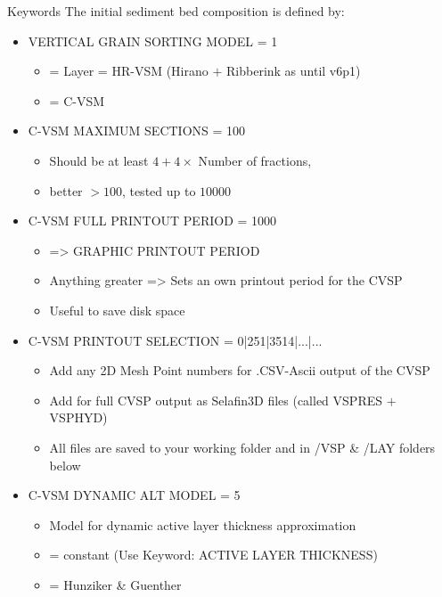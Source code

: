 \medskip
\begin{bclogo}[couleur=blue!10,arrondi=0.1, logo=\bcinfo]{Keywords}
The initial sediment bed composition is defined by:
\begin{itemize}
\item {\ttfamily VERTICAL GRAIN SORTING MODEL = 1}
\begin{itemize}
\item { = Layer = HR-VSM} (Hirano $+$ Ribberink as until \sisyphe v6p1)
\item { = C-VSM}
\end{itemize}
\item {\ttfamily C-VSM MAXIMUM SECTIONS = 100}
\begin{itemize}
\item Should be at least $4 + 4 \times$ {\ttfamily Number of fractions},
\item better $> 100$, tested up to $10000$
\end{itemize}
\item {\ttfamily C-VSM FULL PRINTOUT PERIOD = 1000}
\begin{itemize}
\item { =>  GRAPHIC PRINTOUT PERIOD}
\item Anything greater { =>} Sets an own printout period for the {\ttfamily CVSP}
\item Useful to save disk space
\end{itemize}
\item {\ttfamily C-VSM PRINTOUT SELECTION = 0|251|3514|...|...}
\begin{itemize}
\item Add any 2D Mesh Point numbers for {\ttfamily.CSV-Ascii} output of the CVSP
\item Add {} for full {\ttfamily CVSP} output as Selafin3D files (called {\ttfamily VSPRES $+$ VSPHYD})
\item All files are saved to your working folder and in {\ttfamily /VSP} \& {\ttfamily /LAY} folders below
\end{itemize}
\item {\ttfamily C-VSM DYNAMIC ALT MODEL = 5}
\begin{itemize}
\item Model for dynamic active layer thickness approximation
\item {} = constant (Use Keyword: {\ttfamily ACTIVE LAYER THICKNESS})
\item {} = Hunziker \& Guenther
      \begin{equation*}

\end{equation*}
\end{itemize}
\end{itemize}
\end{bclogo}
